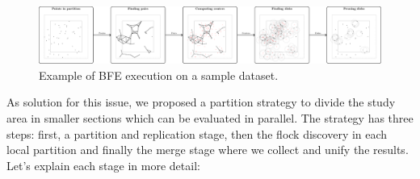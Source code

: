 \documentclass[journal,onecolumn]{IEEEtran}
\begin{document}
\begin{figure}[!ht]
    \centering
    \includegraphics[width=1\textwidth]{figures/MF_stages/flow}
    \caption{Example of BFE execution on a sample dataset.}\label{fig:example}
\end{figure}

As solution for this issue, we proposed a partition strategy to divide the study area in smaller sections which can be evaluated in parallel.  The strategy has three steps: first, a partition and replication stage, then the flock discovery in each local partition and finally the merge stage where we collect and unify the results.  Let's explain each stage in more detail:
\end{document}
